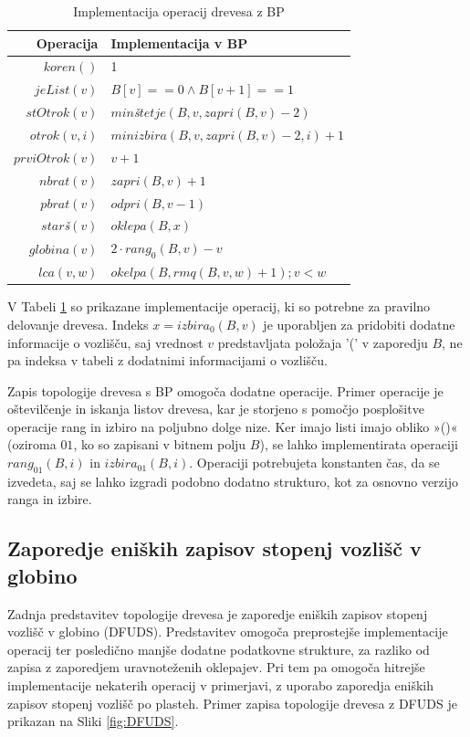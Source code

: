\begin{table}[htb]
    \centering
      \caption{Implementacija operacij drevesa z BP}
    \begin{tabular}{r|l}
\textbf{Operacija}& \textbf{Implementacija v BP} \\\hline
         $koren()$& 1\\
         $jeList(v)$& $B[v]==0 \wedge B[v+1]==1$\\
         $stOtrok(v)$& $min$\textit{š}$tetje(B,v,zapri(B,v)-2)$\\
         $otrok(v,i)$&  $minizbira(B,v,zapri(B,v)-2,i)+1$\\
         $prviOtrok(v)$& $v+1$\\
         $nbrat(v)$& $zapri(B,v)+1$ \\
         $pbrat(v)$& $odpri(B,v-1)$ \\
         $star$\textit{š}$(v)$& $oklepa(B,x)$ \\
         $globina(v)$& $2\cdot rang_0(B,v)-v$ \\
         $lca(v,w)$&  $okelpa(B,rmq(B,v,w)+1);v<w$\\
    \end{tabular}  
    \label{tab:BPop}
\end{table}

V Tabeli \ref{tab:BPop} so prikazane implementacije operacij, ki so potrebne za pravilno delovanje drevesa. Indeks $x=izbira_0(B,v)$ je uporabljen za pridobiti dodatne informacije o vozlišču, saj vrednost $v$ predstavljata položaja '(' v zaporedju $B$, ne pa indeksa v tabeli z dodatnimi informacijami o vozlišču.

Zapis topologije drevesa s BP omogoča dodatne operacije. Primer operacije je oštevilčenje in iskanja listov drevesa, kar je storjeno s pomočjo posplošitve operacije rang in izbiro na poljubno dolge nize. Ker imajo listi imajo obliko »()« (oziroma $01$, ko so zapisani v bitnem polju $B$), se lahko implementirata operaciji $rang_{01}(B,i)$ in $izbira_{01}(B,i)$. Operaciji potrebujeta konstanten čas, da se izvedeta, saj se lahko izgradi podobno dodatno strukturo, kot za osnovno verzijo ranga in izbire.


\subsection{Zaporedje eniških zapisov stopenj vozlišč v globino}\label{sec:DFUDS}

Zadnja predstavitev topologije drevesa je zaporedje eniških zapisov stopenj vozlišč v globino (DFUDS). Predstavitev omogoča preprostejše implementacije operacij ter posledično manjše dodatne podatkovne strukture, za razliko od zapisa z zaporedjem uravnoteženih oklepajev. Pri tem pa omogoča hitrejše implementacije nekaterih operacij v primerjavi, z uporabo zaporedja eniških zapisov stopenj vozlišč po plasteh. Primer zapisa topologije drevesa z DFUDS je prikazan na Sliki \ref{fig:DFUDS}.

